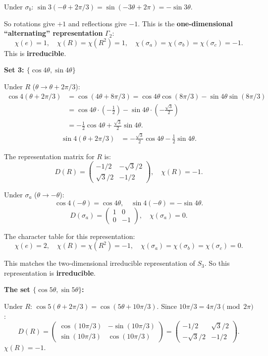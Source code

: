 \documentclass[12pt]{article}
\begin{document}
Under $\sigma_b$: $\sin 3(-\theta + 2\pi/3) = \sin(-3\theta + 2\pi) = -\sin 3\theta$.

So rotations give $+1$ and reflections give $-1$. This is the \textbf{one-dimensional ``alternating'' representation} $\Gamma_2$:
\[
\chi(e) = 1, \quad \chi(R) = \chi(R^2) = 1, \quad \chi(\sigma_a) = \chi(\sigma_b) = \chi(\sigma_c) = -1.
\]
This is \textbf{irreducible}.

\medskip
\noindent\textbf{Set 3: $\{\cos 4\theta, \sin 4\theta\}$}

Under $R$ ($\theta \to \theta + 2\pi/3$):
\begin{align*}
\cos 4(\theta + 2\pi/3) &= \cos(4\theta + 8\pi/3) = \cos 4\theta \cos(8\pi/3) - \sin 4\theta \sin(8\pi/3) \\
&= \cos 4\theta \cdot(-\tfrac{1}{2}) - \sin 4\theta \cdot(-\tfrac{\sqrt{3}}{2}) \\
&= -\tfrac{1}{2}\cos 4\theta + \tfrac{\sqrt{3}}{2}\sin 4\theta.
\end{align*}
\begin{align*}
\sin 4(\theta + 2\pi/3) &= -\tfrac{\sqrt{3}}{2}\cos 4\theta - \tfrac{1}{2}\sin 4\theta.
\end{align*}

The representation matrix for $R$ is:
\[
D(R) = \begin{pmatrix} -1/2 & -\sqrt{3}/2 \\ \sqrt{3}/2 & -1/2 \end{pmatrix}, \quad \chi(R) = -1.
\]

Under $\sigma_a$ ($\theta \to -\theta$):
\[
\cos 4(-\theta) = \cos 4\theta, \quad \sin 4(-\theta) = -\sin 4\theta.
\]
\[
D(\sigma_a) = \begin{pmatrix} 1 & 0 \\ 0 & -1 \end{pmatrix}, \quad \chi(\sigma_a) = 0.
\]

The character table for this representation:
\[
\chi(e) = 2, \quad \chi(R) = \chi(R^2) = -1, \quad \chi(\sigma_a) = \chi(\sigma_b) = \chi(\sigma_c) = 0.
\]

This matches the two-dimensional irreducible representation of $S_3$. So this representation is \textbf{irreducible}.

\medskip
\noindent\textbf{The set $\{\cos 5\theta, \sin 5\theta\}$:}

Under $R$: $\cos 5(\theta + 2\pi/3) = \cos(5\theta + 10\pi/3)$. Since $10\pi/3 = 4\pi/3 \pmod{2\pi}$:
\[
D(R) = \begin{pmatrix} \cos(10\pi/3) & -\sin(10\pi/3) \\ \sin(10\pi/3) & \cos(10\pi/3) \end{pmatrix} = \begin{pmatrix} -1/2 & \sqrt{3}/2 \\ -\sqrt{3}/2 & -1/2 \end{pmatrix}.
\]
$\chi(R) = -1$.
\end{document}
